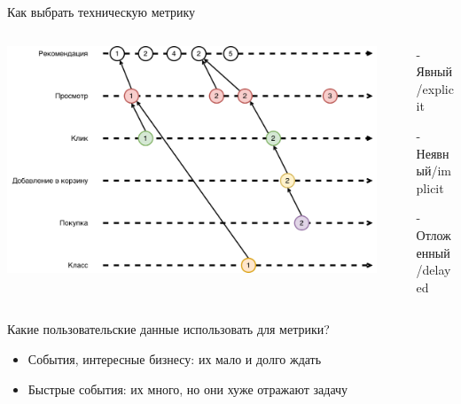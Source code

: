 \documentclass[11pt,aspectratio=169,handout]{beamer}
\begin{document}
\begin{frame}{Как выбрать техническую метрику}

\begin{columns}
\begin{column}{0.55\textwidth}
   \begin{center}
     \includegraphics[scale=0.17]{images/recommendation-events.png}
  \end{center}
\end{column}
\begin{column}{0.4\textwidth}
    \begin{tcolorbox}[colback=gray!5,colframe=gray!80,title=фидбэк на рекомендации]
    \begin{itemize}%
    \item[-] Явный/explicit
    \item[-] Неявный/implicit
    \item[-] Отложенный/delayed
    \end{itemize}
    \end{tcolorbox}
\end{column}
\end{columns}

\vfill

Какие пользовательские данные использовать для метрики?
\begin{itemize}
\item События, интересные бизнесу: их мало и долго ждать
\item Быстрые события: их много, но они хуже отражают задачу
\end{itemize}

\end{frame}
\end{document}
